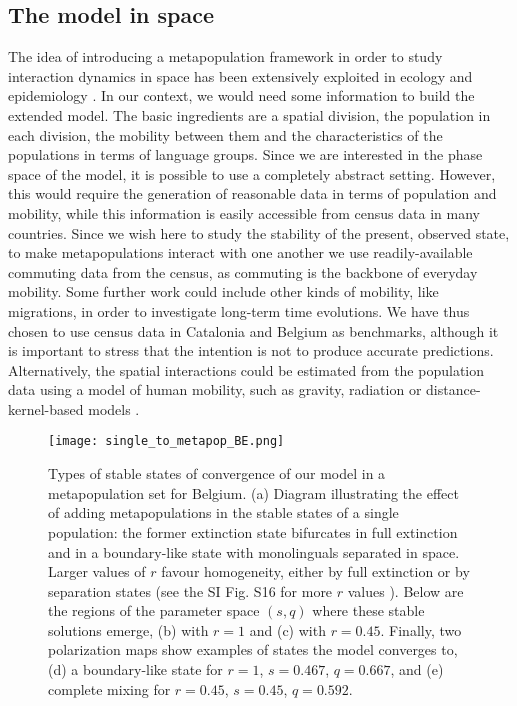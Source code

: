 \documentclass[../thesis.tex]{subfiles}
\begin{document}
\subsection{The model in space}

The idea of introducing a metapopulation framework in order to study interaction
dynamics in space has been extensively exploited in ecology
\cite{HanskiMetapopulationDynamics1998} and epidemiology
\cite{SattenspielStructuredEpidemic1995,BalcanModelingSpatial2010}. In our context, we
would need some information to build the extended model. The basic ingredients are a
spatial division, the population in each division, the mobility between them and the
characteristics of the populations in terms of language groups. Since we are interested
in the phase space of the model, it is possible to use a completely abstract setting.
However, this would require the generation of reasonable data in terms of population and
mobility, while this information is easily accessible from census data in many
countries. Since we wish here to study the stability of the present, observed state, to
make metapopulations interact with one another we use readily-available commuting data
from the census, as commuting is the backbone of everyday mobility. Some further work
could include other kinds of mobility, like migrations, in order to investigate
long-term time evolutions. We have thus chosen to use census data in Catalonia and
Belgium as benchmarks, although it is important to stress that the intention is not to
produce accurate predictions. Alternatively, the spatial interactions could be estimated
from the population data using a model of human mobility, such as gravity, radiation or
distance-kernel-based models
\cite{BarbosaHumanMobility2018,BurridgeSpatialEvolution2017,BurridgeInferringDrivers2021}.

\begin{figure}[hp!]
\centering
    \texttt{[image: single\_to\_metapop\_BE.png]}
    \caption{Types of stable states of convergence of our model in a metapopulation set
    for Belgium. (a) Diagram illustrating the effect of adding metapopulations
    in the stable states of a single population: the former extinction state bifurcates
    in full extinction and in a boundary-like state with monolinguals separated in
    space. Larger values of $r$ favour homogeneity, either by full extinction or by
    separation states (see the SI Fig. S16 for more $r$ values \cite{supp}). Below are
    the regions of the parameter space $(s,q)$ where these stable solutions emerge,
    (b) with $r=1$ and (c) with $r=0.45$. Finally, two polarization
    maps show examples of states the model converges to, (d) a boundary-like
    state for $r=1$, $s=0.467$, $q=0.667$, and (e) complete mixing for
    $r=0.45$, $s=0.45$, $q=0.592$.}
    \label{fig:single_to_metapop_BE}
\end{figure}
\end{document}
